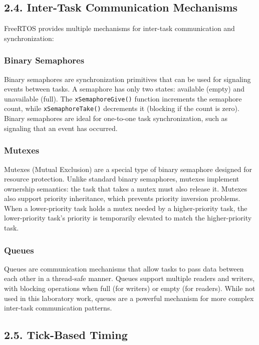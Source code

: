 \documentclass[12pt]{article}
\begin{document}
\subsection*{2.4. Inter-Task Communication Mechanisms}

FreeRTOS provides multiple mechanisms for inter-task communication and synchronization:

\subsubsection*{Binary Semaphores}

Binary semaphores are synchronization primitives that can be used for signaling events between tasks. A semaphore has only two states: available (empty) and unavailable (full). The \texttt{xSemaphoreGive()} function increments the semaphore count, while \texttt{xSemaphoreTake()} decrements it (blocking if the count is zero). Binary semaphores are ideal for one-to-one task synchronization, such as signaling that an event has occurred.

\subsubsection*{Mutexes}

Mutexes (Mutual Exclusion) are a special type of binary semaphore designed for resource protection. Unlike standard binary semaphores, mutexes implement ownership semantics: the task that takes a mutex must also release it. Mutexes also support priority inheritance, which prevents priority inversion problems. When a lower-priority task holds a mutex needed by a higher-priority task, the lower-priority task's priority is temporarily elevated to match the higher-priority task.

\subsubsection*{Queues}

Queues are communication mechanisms that allow tasks to pass data between each other in a thread-safe manner. Queues support multiple readers and writers, with blocking operations when full (for writers) or empty (for readers). While not used in this laboratory work, queues are a powerful mechanism for more complex inter-task communication patterns.

\subsection*{2.5. Tick-Based Timing}
\end{document}
